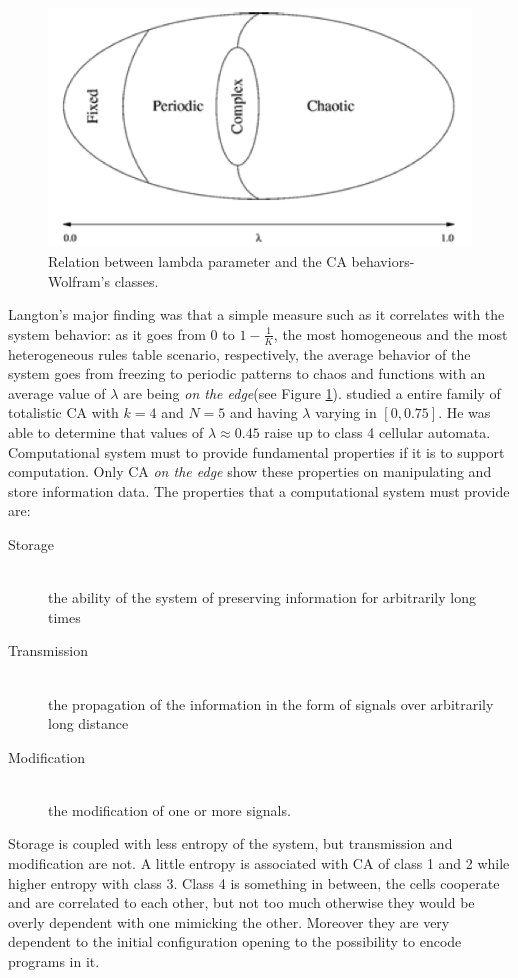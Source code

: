 \begin{figure}
\centering
\caption{Relation between lambda parameter and the CA
behaviors-Wolfram's classes.}\label{lambdaWolframClass}
\includegraphics[scale=0.4]{./images/CA_FDM/edgeofchaos}
\end{figure}
Langton's major finding was that a simple measure such as it correlates with the
system behavior: as it goes from $0$ to $ 1-\frac{1}{K}$, the most
homogeneous and the most heterogeneous rules table scenario, respectively, the average
behavior of the system goes from freezing to periodic patterns to chaos and functions with an average value of $\lambda$ are being \emph{on the edge}\cite{Langton1990}(see Figure \ref{lambdaWolframClass}).
\citeauthor{Langton1990} studied a entire family of totalistic CA with $k=4
$ and $N=5$ and having $\lambda$ varying in $[0,0.75]$. He was able to determine that values
of $\lambda\approx0.45$ raise up to class 4 cellular automata.
Computational system must to provide fundamental properties if it is
to support computation. Only CA \emph{on the edge} show these properties on
manipulating and store information data.
The properties that a computational system must provide are:
\begin{description}
  \item[Storage] \hfill \\
   the ability of the system of preserving information for
arbitrarily long times
  \item[Transmission] \hfill \\
  the propagation of the information in the
form of signals over arbitrarily long distance
  \item[Modification] \hfill \\
	the modification of one or more signals.
\end{description}
Storage is coupled with less entropy of the system, but transmission and
modification are not. A little entropy is associated with CA of class 1 and 2 while
higher entropy with class 3. Class 4 is something in between, the cells cooperate
and are correlated to each other, but not too much otherwise they would be overly
dependent with one mimicking the other. Moreover they are very dependent to the initial
configuration opening to the possibility to encode programs in it.

